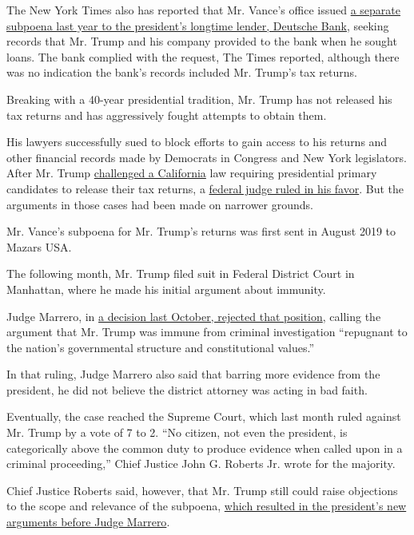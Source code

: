 The New York Times also has reported that Mr. Vance's office issued
\href{https://www.nytimes3xbfgragh.onion/2020/08/05/nyregion/trump-taxes-vance-deutsche-bank.html}{a
separate subpoena last year to the president's longtime lender, Deutsche
Bank}, seeking records that Mr. Trump and his company provided to the
bank when he sought loans. The bank complied with the request, The Times
reported, although there was no indication the bank's records included
Mr. Trump's tax returns.

Breaking with a 40-year presidential tradition, Mr. Trump has not
released his tax returns and has aggressively fought attempts to obtain
them.

His lawyers successfully sued to block efforts to gain access to his
returns and other financial records made by Democrats in Congress and
New York legislators. After Mr. Trump
\href{https://www.nytimes3xbfgragh.onion/2019/08/06/us/politics/california-trump-tax-returns.html?module=inline}{challenged
a California} law requiring presidential primary candidates to release
their tax returns, a
\href{https://www.latimes.com/california/story/2019-09-19/trump-tax-returns-federal-court-challenge-california}{federal
judge ruled in his favor}. But the arguments in those cases had been
made on narrower grounds.

Mr. Vance's subpoena for Mr. Trump's returns was first sent in August
2019 to Mazars USA.

The following month, Mr. Trump filed suit in Federal District Court in
Manhattan, where he made his initial argument about immunity.

Judge Marrero, in
\href{https://www.nytimes3xbfgragh.onion/2019/10/07/nyregion/trump-taxes-lawsuit-vance.html?searchResultPosition=6}{a
decision last October, rejected that position}, calling the argument
that Mr. Trump was immune from criminal investigation ``repugnant to the
nation's governmental structure and constitutional values.''

In that ruling, Judge Marrero also said that barring more evidence from
the president, he did not believe the district attorney was acting in
bad faith.

Eventually, the case reached the Supreme Court, which last month ruled
against Mr. Trump by a vote of 7 to 2. ``No citizen, not even the
president, is categorically above the common duty to produce evidence
when called upon in a criminal proceeding,'' Chief Justice John G.
Roberts Jr. wrote for the majority.

Chief Justice Roberts said, however, that Mr. Trump still could raise
objections to the scope and relevance of the subpoena,
\href{https://www.nytimes3xbfgragh.onion/2020/07/15/nyregion/donald-trump-taxes-cyrus-vance.html?searchResultPosition=3}{which
resulted in the president's new arguments before Judge Marrero}.

